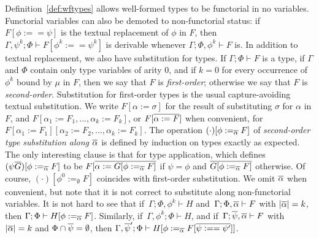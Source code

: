 \documentclass[runningheads]{llncs}
\begin{document}
Definition~\ref{def:wftypes} allows well-formed types to be functorial
in no variables. Functorial variables can also be demoted to
non-functorial status: if $F[\phi :== \psi]$ is the textual
replacement of $\phi$ in $F$, then $\Gamma, \psi^k; \Phi \vdash
F[\phi^k :== \psi^k]$ is derivable whenever $\Gamma; \Phi, \phi^k
\vdash F$ is.  In addition to textual replacement, we also have
substitution for types. If $\Gamma;\Phi\vdash F$ is a type, if
$\Gamma$ and $\Phi$ contain only type variables of arity $0$, and if
$k=0$ for every occurrence of $\phi^k$ bound by $\mu$ in $F$, then we
say that $F$ is {\em first-order}; otherwise we say that $F$ is {\em
  second-order}.  Substitution for first-order types is the usual
capture-avoiding textual substitution. We write $F[\alpha := \sigma]$
for the result of substituting $\sigma$ for $\alpha$ in $F$, and
$F[\alpha_1 := F_1,...,\alpha_k := F_k]$, or $F[\overline{\alpha := F}]$
when convenient, for $F[\alpha_1 := F_1][\alpha_2 := F_2,...,\alpha_k
  := F_k]$. The operation $(\cdot)[\phi :=_{\overline{\alpha}} F]$ of {\em
  second-order type substitution along $\overline{\alpha}$} is defined by
induction on types exactly as expected. The only interesting clause is
that for type application, which defines $(\psi \overline{G})[\phi
  :=_{\overline{\alpha}} F]$ to be $ F[\overline{\alpha := G[\phi :=_{\overline{\alpha}}
      F]}$ if $\psi = \phi$ and $\overline{G[\phi :=_{\overline{\alpha}} F]}$
  otherwise. Of course, $(\cdot)[\phi^0 :=_\emptyset F]$ coincides
  with first-order substitution. We omit $\overline{\alpha}$ when convenient,
  but note that it is not correct to substitute along non-functorial
  variables. It is not hard to see that if \,$\Gamma; \Phi,\phi^k
  \vdash H$ and\, $\Gamma;\Phi, \overline{\alpha} \vdash F$ with
  $|\overline{\alpha}| = k$, then $\Gamma;\Phi \vdash H[\phi :=_{\overline{\alpha}}
    F]$.  Similarly, if \,$\Gamma, \phi^k; \Phi \vdash H$, and if\,
  $\Gamma; \overline{\psi},\overline{\alpha} \vdash F$ with $|\overline{\alpha}| = k$ and
  $\Phi \cap \overline{\psi} = \emptyset$, then $\Gamma,\overline{\psi}';\Phi \vdash
  H[\phi :=_{\overline{\alpha}} F[\overline{\psi :== \psi'}]]$.
\end{document}
